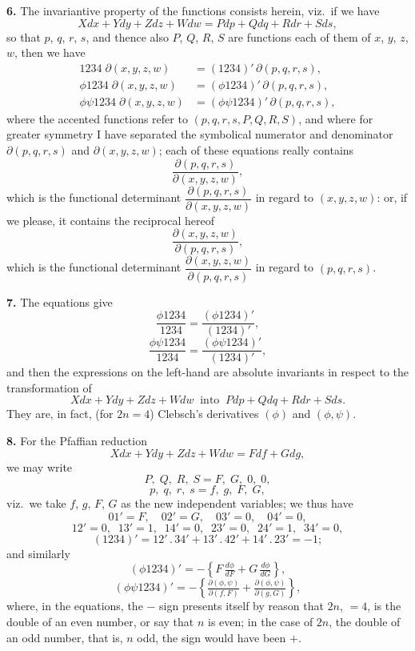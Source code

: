 \documentclass[11pt]{article}
\begin{document}
\medskip
\textbf{6.} The invariantive property of the functions consists herein, viz.\ if we have
\[ Xdx + Ydy + Zdz + Wdw = Pdp + Qdq + Rdr + Sds, \]
so that $p$, $q$, $r$, $s$, and thence also $P$, $Q$, $R$, $S$ are functions each of them of $x$, $y$, $z$, $w$, then we have
\begin{align*}
1234\;\partial(x,y,z,w) &= (1234)'\,\partial(p,q,r,s),\\
\phi 1234\;\partial(x,y,z,w) &= (\phi 1234)'\,\partial(p,q,r,s),\\
\phi\psi 1234\;\partial(x,y,z,w) &= (\phi\psi 1234)'\,\partial(p,q,r,s),
\end{align*}
where the accented functions refer to $(p,q,r,s,P,Q,R,S)$, and where for greater symmetry I have separated the symbolical numerator and denominator $\partial(p,q,r,s)$ and $\partial(x,y,z,w)$; each of these equations really contains
\[ \frac{\partial(p,q,r,s)}{\partial(x,y,z,w)}, \]
which is the functional determinant $\dfrac{\partial(p,q,r,s)}{\partial(x,y,z,w)}$ in regard to $(x,y,z,w)$: or, if we please, it contains the reciprocal hereof
\[ \frac{\partial(x,y,z,w)}{\partial(p,q,r,s)}, \]
which is the functional determinant $\dfrac{\partial(x,y,z,w)}{\partial(p,q,r,s)}$ in regard to $(p,q,r,s)$.

\medskip
\textbf{7.} The equations give
\[ \frac{\phi 1234}{1234} = \frac{(\phi 1234)'}{(1234)'}, \]
\[ \frac{\phi\psi 1234}{1234} = \frac{(\phi\psi 1234)'}{(1234)'}, \]
and then the expressions on the left-hand are absolute invariants in respect to the transformation of
\[ Xdx + Ydy + Zdz + Wdw\;\;\text{into}\;\;Pdp + Qdq + Rdr + Sds. \]
They are, in fact, (for $2n=4$) Clebsch's derivatives $(\phi)$ and $(\phi,\psi)$.

\medskip
\textbf{8.} For the Pfaffian reduction
\[ Xdx + Ydy + Zdz + Wdw = Fdf + Gdg, \]
we may write
\[ P,\;Q,\;R,\;S = F,\;G,\;0,\;0, \]
\[ p,\;q,\;r,\;s = f,\;g,\;F,\;G, \]
viz.\ we take $f$, $g$, $F$, $G$ as the new independent variables; we thus have
\[ 01' = F,\quad 02' = G,\quad 03' = 0,\quad 04' = 0, \]
\[ 12' = 0,\;\; 13' = 1,\;\; 14' = 0,\;\; 23' = 0,\;\; 24' = 1,\;\; 34' = 0, \]
\[ (1234)' = 12'\,.\,34' + 13'\,.\,42' + 14'\,.\,23' = -1; \]
and similarly
\[ (\phi 1234)' = -\left\{F\,\tfrac{d\phi}{dF} + G\,\tfrac{d\phi}{dG}\right\}, \]
\[ (\phi\psi 1234)' = -\left\{\tfrac{\partial(\phi,\psi)}{\partial(f,F)} + \tfrac{\partial(\phi,\psi)}{\partial(g,G)}\right\}, \]
where, in the equations, the $-$ sign presents itself by reason that $2n$, $=4$, is the double of an even number, or say that $n$ is even; in the case of $2n$, the double of an odd number, that is, $n$ odd, the sign would have been $+$.
\end{document}
